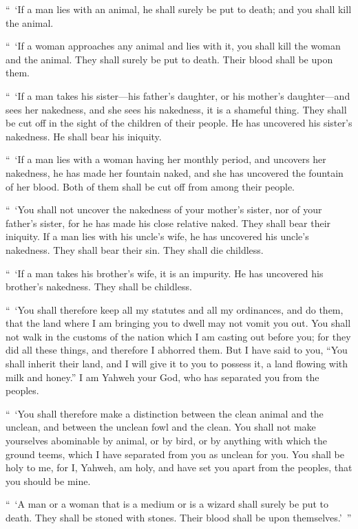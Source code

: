 {\par }{\PP {}“ ‘If a man lies with an animal, he shall surely be put to death; and you shall kill the animal.
\par }{\PP {}“ ‘If a woman approaches any animal and lies with it, you shall kill the woman and the animal. They shall surely be put to death. Their blood shall be upon them.
\par }{\PP {}“ ‘If a man takes his sister—his father’s daughter, or his mother’s daughter—and sees her nakedness, and she sees his nakedness, it is a shameful thing. They shall be cut off in the sight of the children of their people. He has uncovered his sister’s nakedness. He shall bear his iniquity.
\par }{\PP {}“ ‘If a man lies with a woman having her monthly period, and uncovers her nakedness, he has made her fountain naked, and she has uncovered the fountain of her blood. Both of them shall be cut off from among their people.
\par }{\PP {}“ ‘You shall not uncover the nakedness of your mother’s sister, nor of your father’s sister, for he has made his close relative naked. They shall bear their iniquity.
If a man lies with his uncle’s wife, he has uncovered his uncle’s nakedness. They shall bear their sin. They shall die childless.
\par }{\PP {}“ ‘If a man takes his brother’s wife, it is an impurity. He has uncovered his brother’s nakedness. They shall be childless.
\par }{\PP {}“ ‘You shall therefore keep all my statutes and all my ordinances, and do them, that the land where I am bringing you to dwell may not vomit you out.
You shall not walk in the customs of the nation which I am casting out before you; for they did all these things, and therefore I abhorred them.
But I have said to you, “You shall inherit their land, and I will give it to you to possess it, a land flowing with milk and honey.” I am Yahweh your God, who has separated you from the peoples.
\par }{\PP {}“ ‘You shall therefore make a distinction between the clean animal and the unclean, and between the unclean fowl and the clean. You shall not make yourselves abominable by animal, or by bird, or by anything with which the ground teems, which I have separated from you as unclean for you.
You shall be holy to me, for I, Yahweh, am holy, and have set you apart from the peoples, that you should be mine.
\par }{\PP {}“ ‘A man or a woman that is a medium or is a wizard shall surely be put to death. They shall be stoned with stones. Their blood shall be upon themselves.’ ”

}

